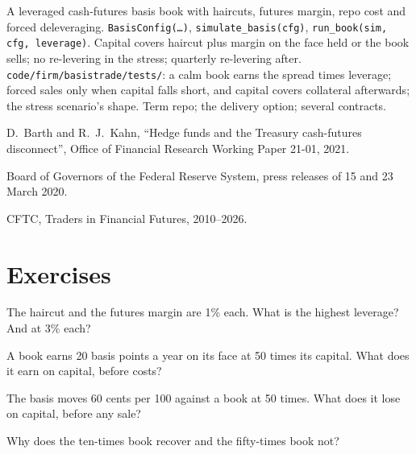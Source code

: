 \begin{build}
 A leveraged cash-futures basis book with haircuts, futures margin, repo cost and forced deleveraging.
 \texttt{BasisConfig(\dots)}, \texttt{simulate\_basis(cfg)}, \texttt{run\_book(sim, cfg, leverage)}.
 Capital covers haircut plus margin on the face held or the book sells; no re-levering in the stress; quarterly re-levering after.
 \texttt{code/firm/basistrade/tests/}: a calm book earns the spread times leverage; forced sales only when capital falls
short, and capital covers collateral afterwards; the stress scenario's shape.
 Term repo; the delivery option; several contracts.
\end{build}

\begin{omsources}
\item D.~Barth and R.~J.~Kahn, ``Hedge funds and the Treasury cash-futures disconnect'', Office of Financial Research Working Paper 21-01, 2021.
\item Board of Governors of the Federal Reserve System, press releases of 15 and 23 March 2020.
\item CFTC, Traders in Financial Futures, 2010--2026.
\end{omsources}

\section{Exercises}

\begin{exercise}[$\star$]\label{exo:s2:the-bond-futures-basis-trade:1}
The haircut and the futures margin are 1\% each. What is the highest leverage? And at 3\% each?
\end{exercise}

\begin{exercise}[$\star$]\label{exo:s2:the-bond-futures-basis-trade:2}
A book earns 20 basis points a year on its face at 50 times its capital. What does it earn on capital, before costs?
\end{exercise}

\begin{exercise}[$\star$]\label{exo:s2:the-bond-futures-basis-trade:3}
The basis moves 60 cents per 100 against a book at 50 times. What does it lose on capital, before any sale?
\end{exercise}

\begin{exercise}[$\star\star$]\label{exo:s2:the-bond-futures-basis-trade:4}
Why does the ten-times book recover and the fifty-times book not?
\end{exercise}

